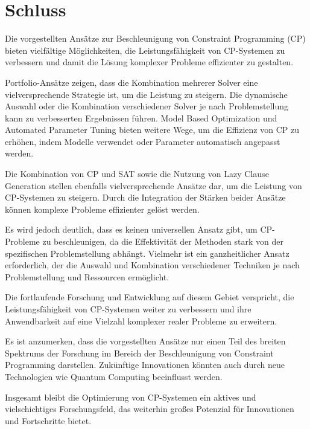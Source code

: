   

  

\section{Schluss}
\label{sec:Schluss}
Die vorgestellten Ansätze zur Beschleunigung von Constraint Programming (CP)
bieten vielfältige Möglichkeiten, die Leistungsfähigkeit von CP-Systemen zu
verbessern und damit die Lösung komplexer Probleme effizienter zu gestalten.

Portfolio-Ansätze zeigen, dass die Kombination mehrerer Solver eine
vielversprechende Strategie ist, um die Leistung zu steigern. Die dynamische
Auswahl oder die Kombination verschiedener Solver je nach Problemstellung kann
zu verbesserten Ergebnissen führen. Model Based Optimization und Automated
Parameter Tuning bieten weitere Wege, um die Effizienz von CP zu erhöhen, indem
Modelle verwendet oder Parameter automatisch angepasst werden.

Die Kombination von CP und SAT sowie die Nutzung von Lazy Clause Generation
stellen ebenfalls vielversprechende Ansätze dar, um die Leistung von CP-Systemen
zu steigern. Durch die Integration der Stärken beider Ansätze können komplexe
Probleme effizienter gelöst werden.

Es wird jedoch deutlich, dass es keinen universellen Ansatz gibt, um CP-Probleme
zu beschleunigen, da die Effektivität der Methoden stark von der spezifischen
Problemstellung abhängt. Vielmehr ist ein ganzheitlicher Ansatz erforderlich,
der die Auswahl und Kombination verschiedener Techniken je nach Problemstellung
und Ressourcen ermöglicht.

Die fortlaufende Forschung und Entwicklung auf diesem Gebiet verspricht, die
Leistungsfähigkeit von CP-Systemen weiter zu verbessern und ihre Anwendbarkeit
auf eine Vielzahl komplexer realer Probleme zu erweitern.

Es ist anzumerken, dass die vorgestellten Ansätze nur einen Teil des breiten
Spektrums der Forschung im Bereich der Beschleunigung von Constraint Programming
darstellen. Zukünftige Innovationen könnten auch durch neue Technologien wie
Quantum Computing beeinflusst werden.

Insgesamt bleibt die Optimierung von CP-Systemen ein aktives und vielschichtiges
Forschungsfeld, das weiterhin großes Potenzial für Innovationen und Fortschritte
bietet.


\printbibliography[heading=bibintoc]





